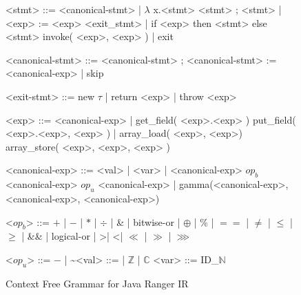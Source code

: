 %
\begin{figure}
\begin{grammar}
<stmt> ::= <canonical-stmt> | $\lambda$ x.<stmt> 
\alt <stmt> ; <stmt> | <exp> := <exp>
\alt <exit_stmt> | if <exp> then <stmt> else <stmt> 
\alt invoke( <exp>, <exp> )  | exit

<canonical-stmt> ::= <canonical-stmt> ; <canonical-stmt> 
 := <canonical-exp> | skip

<exit-stmt> ::=  new $\tau$  | return <exp> |  throw <exp> 

<exp>  ::=  <canonical-exp> | get_field( <exp>.<exp> ) 
\alt put_field( <exp>.<exp>, <exp> ) | array_load( <exp>, <exp>) 
\alt array_store( <exp>, <exp>, <exp> ) 

<canonical-exp> ::= <val> | <var> | <canonical-exp> $op_b$ <canonical-exp> 
\alt $op_u$ <canonical-exp> | gamma(<canonical-exp>, <canonical-exp>, <canonical-exp>)

<$op_b$> ::= $+$ | $-$ | $*$ | $\div$ | \& | bitwise-or | $\oplus$ | \% | $==$ | $\neq$ | $\leq$ | $\geq$ | \&\& | logical-or | \textgreater | \textless | $\ll$ | $\gg$ | $\ggg$

<$op_u$> ::= $-$ | \textasciitilde  \quad <val> ::= \unit | $\mathbb{Z}$ |  $\mathbb{C}$ \quad <var> ::= ID_$\mathbb{N}$
\end{grammar}
\caption{Context Free Grammar for Java Ranger IR}
\label{fig:grammar}
\end{figure}


